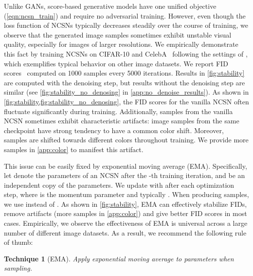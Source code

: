 \documentclass{article}
\newtheorem{recipe}{Technique}
\begin{document}
Unlike GANs, score-based generative models have one unified objective (\cref{eqn:ncsn_train}) and require no adversarial training.
However, even though the loss function of NCSNs typically decreases steadily over the course of training, we observe that the generated image samples sometimes exhibit unstable visual quality, especially for images of larger resolutions. We empirically demonstrate this fact by training NCSNs on CIFAR-10  and CelebA~\cite{liu2015faceattributes}  following the settings of \cite{song2019generative}, which exemplifies typical behavior on other image datasets. We report FID scores~\cite{heusel2017gans} computed on 1000 samples every 5000 iterations. Results in \cref{fig:stability} are computed with the denoising step, but results without the denoising step are similar (see \cref{fig:stability_no_denosing} in \cref{app:no_denoise_results}). As shown in \cref{fig:stability,fig:stability_no_denosing}, the FID scores for the vanilla NCSN often fluctuate significantly during training. Additionally, samples from the vanilla NCSN sometimes exhibit characteristic artifacts: image samples from the same checkpoint have strong tendency to have a common color shift. Moreover, samples are shifted towards different colors throughout training. We provide more samples in \cref{app:color} to manifest this artifact.



This issue can be easily fixed by exponential moving average (EMA). Specifically, let  denote the parameters of an NCSN after the -th training iteration, and  be an independent copy of the parameters. We update  with  after each optimization step, where  is the momentum parameter and typically . When producing samples, we use  instead of . As shown in \cref{fig:stability}, EMA can effectively stabilize FIDs, remove artifacts (more samples in \cref{app:color}) and give better FID scores in most cases. Empirically, we observe the effectiveness of EMA is universal across a large number of different image datasets. As a result, we recommend the following rule of thumb:
\begin{recipe}[EMA]\label{rec:ema}
Apply exponential moving average to parameters when sampling.
\end{recipe}
\end{document}
